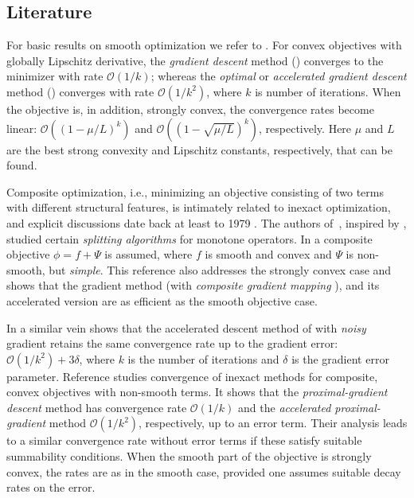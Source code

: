 \documentclass{amsart}
\newcommand{\bigo}[1]{{\mathcal{O}\left(#1\right)}}
\theoremstyle{definition}
\begin{document}
	\subsection{Literature}\label{sec:literature}

For basic results on smooth optimization we refer to \cite{nesterov2004intro}. For convex objectives with globally Lipschitz derivative, the \emph{gradient descent} method (\cite[p. 25 (1.2.9)]{nesterov2004intro}) converges to the minimizer with rate $\bigo{1/k}$; whereas the \emph{optimal} or \emph{accelerated gradient descent} method (\cite[p. 76 (2.2.6)]{nesterov2004intro}) converges with rate $\bigo{1/k^2}$, where $k$ is number of iterations. When the objective is, in addition, strongly convex, the convergence rates become linear: $\bigo{(1-\mu/L)^k}$ and $\bigo{(1-\sqrt{\mu/L})^k}$, respectively. Here $\mu$ and $L$ are the best strong convexity and Lipschitz constants, respectively, that can be found.

Composite optimization, i.e., minimizing an objective consisting of two terms with different structural features, is intimately related to inexact optimization, and explicit discussions date back at least to 1979 \cite{lions1979splitting}. The authors of~\cite{lions1979splitting},  inspired by \cite{peaceman1955numerical,douglas1956numerical}, studied certain \emph{splitting algorithms} for monotone operators.
In \cite{nesterov2007gradient} a composite objective $\phi=f+\Psi$ is assumed, where $f$ is smooth and convex and $\Psi$ is non-smooth, but \emph{simple}. This reference also addresses the strongly convex case and shows that the gradient method (with \emph{composite gradient mapping} \cite[p. 4 (2.6)]{nesterov2007gradient}), and its accelerated version are as efficient as the smooth objective case.

In a similar vein \cite{daspremont2008smooth} shows that the accelerated descent method of \cite{nesterov1983method} with \emph{noisy} gradient retains the same convergence rate up to the gradient error: $\bigo{1/k^2} + 3\delta$, where $k$ is the number of iterations and $\delta$ is the gradient error parameter. Reference \cite{schmidt2011convergence} studies convergence of inexact methods for composite, convex objectives with non-smooth terms. It shows that the \emph{proximal-gradient descent} method has convergence rate $\bigo{1/k}$ and the \emph{accelerated proximal-gradient} method $\bigo{1/k^2}$, respectively, up to an error term. Their analysis leads to a similar convergence rate without error terms if these satisfy suitable summability conditions. When the smooth part of the objective is strongly convex, the rates are as in the smooth case, provided one assumes suitable decay rates on the error.
\end{document}
